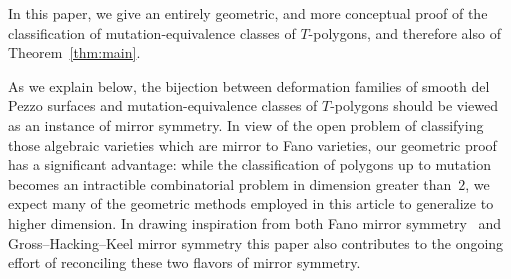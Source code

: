 \documentclass[pdftex]{sigma}
\numberwithin{equation}{section}
\begin{document}
In this paper, we give an entirely geometric, and more conceptual proof of the classification of mutation-equivalence classes of $T$-polygons, and therefore also of Theorem~\ref{thm:main}.

As we explain below, the bijection between deformation families of smooth del Pezzo surfaces and mutation-equivalence classes of $T$-polygons should be viewed as an instance of mirror symmetry. In view of the open problem of classifying those algebraic varieties which are mirror to Fano varieties, our geometric proof has a significant advantage: while the classification of polygons up to mutation becomes an intractible combinatorial problem in dimension greater than~$2$, we expect many of the geometric methods employed in this article to generalize to higher dimension. In drawing inspiration from both Fano mirror symmetry~\cite{AkhtarCoatesCorti} and Gross--Hacking--Keel mirror symmetry \cite{GrossHackingKeelMS} this paper also contributes to the ongoing effort of reconciling these two flavors of mirror symmetry.
\end{document}

